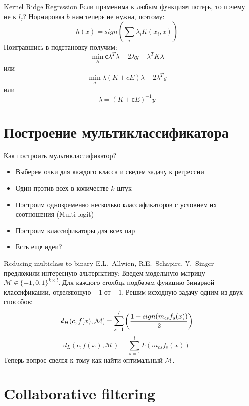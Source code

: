 \documentclass[14pt, fleqn, xcolor={dvipsnames, table}]{beamer}
\begin{document}
\begin{frame}{Kernel Ridge Regression}
\small
Если применима к любым функциям потерь, то почему не к $l_q$? Нормировка $b$ нам теперь не нужна, поэтому:
$$
h(x) = sign \left(\sum_i \lambda_i K(x_i, x)\right)
$$
Поигравшись в подстановку получим:
$$
\min_\lambda с \lambda^T\lambda - 2 \lambda y - \lambda^T K \lambda
$$
или
$$
\min_\lambda \lambda (K + cE) \lambda - 2\lambda^T y
$$
или
$$
\lambda = \left(K + с E\right)^{-1}y
$$
\end{frame}

\section{Построение мультиклассификатора} %
\begin{frame}{Как построить мультиклассификатор?}
\begin{itemize}
  \item Выберем очки для каждого класса и сведем задачу к регрессии
  \item Один против всех в количестве $k$ штук
  \item Построим одновременно несколько классификаторов с условием их соотношения (Multi-logit)
  \item Построим классификаторы для всех пар
  \item Есть еще идеи?
\end{itemize}
\end{frame}

\begin{frame}{Reducing multiclass to binary}
\small
E.L.~Allwien, R.E.~Schapire, Y.~Singer предложили интересную альтернативу:
Введем модельную матрицу $\mathcal{M} \in \{-1,0,1\}^{k\times l}$. Для каждого столбца подберем функцию бинарной классификации, отделяющую $+1$ от $-1$.
Решим исходную задачу одним из двух способов:
$$
d_H(c, f(x), \mathcal{M}) = \sum_{s = 1}^l\left({1 - sign(m_{cs} f_s(x)) \over 2}\right)
$$
$$
d_L(c, f(x), \mathcal{M}) = \sum_{s = 1}^l L(m_{cs} f_s(x))
$$
Теперь вопрос свелся к тому как найти оптимальный $\mathcal{M}$.
\end{frame}

\section{Collaborative filtering}
\end{document}
